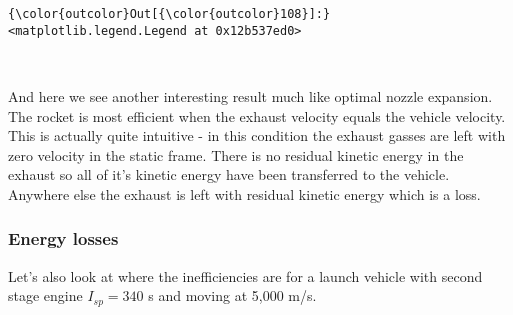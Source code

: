 \documentclass[11pt]{article}
\begin{document}
\begin{Verbatim}[commandchars=\\\{\}]
{\color{outcolor}Out[{\color{outcolor}108}]:} <matplotlib.legend.Legend at 0x12b537ed0>
\end{Verbatim}
            
    \begin{center}
    \end{center}
    { \hspace*{\fill} \\}
    
    And here we see another interesting result much like optimal nozzle
expansion. The rocket is most efficient when the exhaust velocity equals
the vehicle velocity. This is actually quite intuitive - in this
condition the exhaust gasses are left with zero velocity in the static
frame. There is no residual kinetic energy in the exhaust so all of it's
kinetic energy have been transferred to the vehicle. Anywhere else the
exhaust is left with residual kinetic energy which is a loss.

    \subsubsection{Energy losses}\label{energy-losses}

Let's also look at where the inefficiencies are for a launch vehicle
with second stage engine \(I_{sp} = 340\) s and moving at 5,000 m/s.
\end{document}
